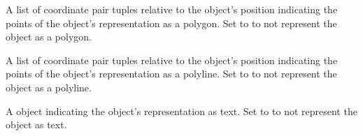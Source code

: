 \documentclass[letterpaper,10pt,english]{sphinxmanual}
\begin{document}
\begin{fulllineitems}
\begin{fulllineitems}
\end{fulllineitems}


\begin{fulllineitems}
\label{index:tmx.Object.polygon}
A list of coordinate pair tuples relative to the object's
position indicating the points of the object's representation as
a polygon.  Set to  to not represent the object as a
polygon.

\end{fulllineitems}


\begin{fulllineitems}
\label{index:tmx.Object.polyline}
A list of coordinate pair tuples relative to the object's
position indicating the points of the object's representation as
a polyline.  Set to  to not represent the object as
a polyline.

\end{fulllineitems}


\begin{fulllineitems}
\label{index:tmx.Object.text}
A {\hyperref[index:tmx.Text]{\emph{}}} object indicating the object's representation as
text.  Set to  to not represent the object as text.

\end{fulllineitems}


\end{fulllineitems}

\end{document}
